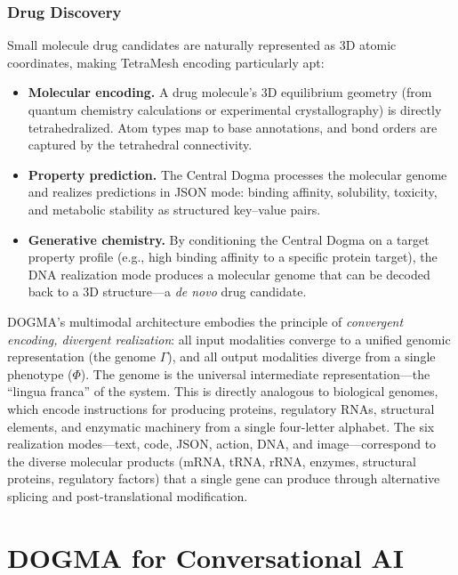 \subsubsection{Drug Discovery}

Small molecule drug candidates are naturally represented as 3D atomic coordinates, making TetraMesh encoding particularly apt:

\begin{itemize}[leftmargin=1.5em]
  \item \textbf{Molecular encoding.} A drug molecule's 3D equilibrium geometry (from quantum chemistry calculations or experimental crystallography) is directly tetrahedralized. Atom types map to base annotations, and bond orders are captured by the tetrahedral connectivity.
  \item \textbf{Property prediction.} The Central Dogma processes the molecular genome and realizes predictions in JSON mode: binding affinity, solubility, toxicity, and metabolic stability as structured key--value pairs.
  \item \textbf{Generative chemistry.} By conditioning the Central Dogma on a target property profile (e.g., high binding affinity to a specific protein target), the DNA realization mode produces a molecular genome that can be decoded back to a 3D structure---a \emph{de novo} drug candidate.
\end{itemize}

\begin{dogmadef}
DOGMA's multimodal architecture embodies the principle of \emph{convergent encoding, divergent realization}: all input modalities converge to a unified genomic representation (the genome $\Gamma$), and all output modalities diverge from a single phenotype ($\Phi$). The genome is the universal intermediate representation---the ``lingua franca'' of the system. This is directly analogous to biological genomes, which encode instructions for producing proteins, regulatory RNAs, structural elements, and enzymatic machinery from a single four-letter alphabet. The six realization modes---text, code, JSON, action, DNA, and image---correspond to the diverse molecular products (mRNA, tRNA, rRNA, enzymes, structural proteins, regulatory factors) that a single gene can produce through alternative splicing and post-translational modification.
\end{dogmadef}

\section{DOGMA for Conversational AI}
\label{sec:dogma-conversational}

